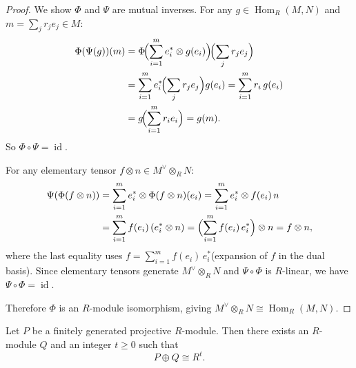 \begin{proof}
    We show $\Phi$ and $\Psi$ are mutual inverses. For any $g \in \operatorname{Hom}_R(M,N)$ and $m = \sum_j r_j e_j \in M$:
    \begin{align*}
        \Phi(\Psi(g))(m) & = \Phi\!\Bigl(\sum_{i=1}^m e_i^* \otimes g(e_i)\Bigr)\!\Bigl(\sum_j r_j e_j\Bigr)   \\
                         & = \sum_{i=1}^m e_i^*\!\Bigl(\sum_j r_j e_j\Bigr) g(e_i) = \sum_{i=1}^m r_i\, g(e_i) \\
                         & = g\!\Bigl(\sum_{i=1}^m r_i e_i\Bigr) = g(m).
    \end{align*}
    So $\Phi \circ \Psi = \operatorname{id}$.

    For any elementary tensor $f \otimes n \in M^{\vee} \otimes_R N$:
    \begin{align*}
        \Psi(\Phi(f \otimes n)) & = \sum_{i=1}^m e_i^* \otimes \Phi(f \otimes n)(e_i) = \sum_{i=1}^m e_i^* \otimes f(e_i)\,n                   \\
                                & = \sum_{i=1}^m f(e_i)\, (e_i^* \otimes n) = \Bigl(\sum_{i=1}^m f(e_i)\, e_i^*\Bigr) \otimes n = f \otimes n,
    \end{align*}
    where the last equality uses $f = \sum_{i=1}^m f(e_i)\, e_i^*$(expansion of $f$ in the dual basis). Since elementary tensors generate $M^{\vee} \otimes_R N$ and $\Psi \circ \Phi$ is $R$-linear, we have $\Psi \circ \Phi = \operatorname{id}$.

    Therefore $\Phi$ is an $R$-module isomorphism, giving $M^{\vee} \otimes_R N \cong \operatorname{Hom}_R(M, N)$.
\end{proof}

\begin{lemma}
    Let $P$ be a finitely generated projective $R$-module. Then there exists an
    $R$-module $Q$ and an integer $t\geq 0$ such that
    \[
        P\oplus Q\cong R^t.
    \]
\end{lemma}

